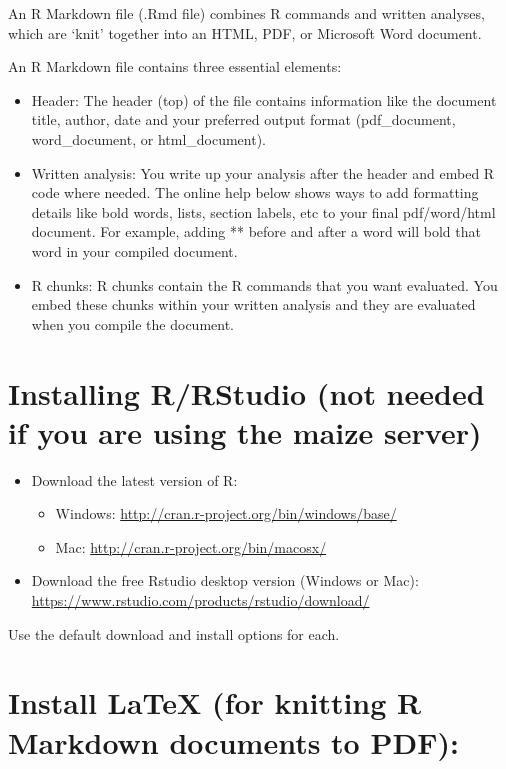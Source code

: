 \documentclass[
]{book}
\providecommand{\tightlist}{%
  \setlength{\itemsep}{0pt}\setlength{\parskip}{0pt}}
\begin{document}
An R Markdown file (.Rmd file) combines R commands and written analyses, which are `knit' together into an HTML, PDF, or Microsoft Word document.

An R Markdown file contains three essential elements:

\begin{itemize}
\item
  Header: The header (top) of the file contains information like the document title, author, date and your preferred output format (pdf\_document, word\_document, or html\_document).
\item
  Written analysis: You write up your analysis after the header and embed R code where needed. The online help below shows ways to add formatting details like bold words, lists, section labels, etc to your final pdf/word/html document. For example, adding ** before and after a word will bold that word in your compiled document.
\item
  R chunks: R chunks contain the R commands that you want evaluated. You embed these chunks within your written analysis and they are evaluated when you compile the document.
\end{itemize}

\hypertarget{installing-rrstudio-not-needed-if-you-are-using-the-maize-server}{%
\section{Installing R/RStudio (not needed if you are using the maize server)}\label{installing-rrstudio-not-needed-if-you-are-using-the-maize-server}}

\begin{itemize}
\tightlist
\item
  Download the latest version of R:

  \begin{itemize}
  \tightlist
  \item
    Windows: \url{http://cran.r-project.org/bin/windows/base/}
  \item
    Mac: \url{http://cran.r-project.org/bin/macosx/}
  \end{itemize}
\item
  Download the free Rstudio desktop version (Windows or Mac): \url{https://www.rstudio.com/products/rstudio/download/}
\end{itemize}

Use the default download and install options for each.

\hypertarget{install-latex-for-knitting-r-markdown-documents-to-pdf}{%
\section{Install LaTeX (for knitting R Markdown documents to PDF):}\label{install-latex-for-knitting-r-markdown-documents-to-pdf}}
\end{document}
